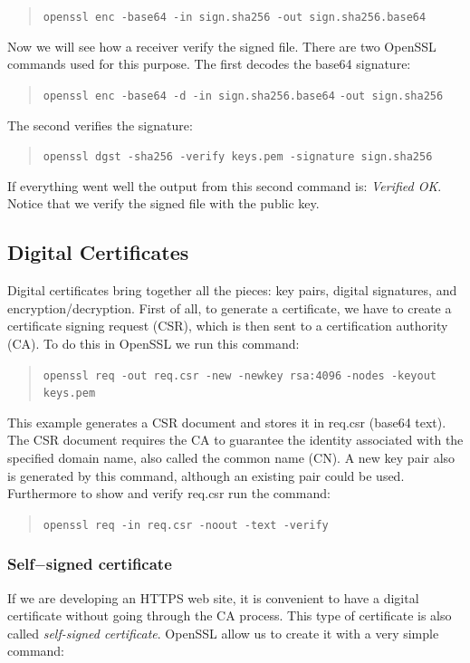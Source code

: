 \documentclass[11pt]{article}
\begin{document}
\begin{quote}
 \verb|openssl enc -base64 -in sign.sha256 -out sign.sha256.base64|
\end{quote}

Now we will see how a receiver verify the signed file. There are two OpenSSL commands used for this purpose. The first decodes the base64 signature:

\begin{quote}
 \verb|openssl enc -base64 -d -in sign.sha256.base64|\newline
 \verb|-out sign.sha256|
\end{quote}

The second verifies the signature:

\begin{quote}
 \verb|openssl dgst -sha256 -verify keys.pem -signature sign.sha256|
\end{quote}

If everything went well the output from this second command is: {\em Verified OK}. Notice that we verify the signed file with the public key.

\subsection{Digital Certificates}
Digital certificates bring together all the pieces: key pairs, digital signatures, and encryption/decryption. First of all, to generate a certificate, we have to create a certificate signing request (CSR), which is then sent to a certification authority (CA). To do this in OpenSSL we run this command:

\begin{quote}
 \verb|openssl req -out req.csr -new -newkey rsa:4096|\newline
 \verb|-nodes -keyout keys.pem|
\end{quote}

This example generates a CSR document and stores it in req.csr (base64 text). The CSR document requires the CA to guarantee the identity associated with the specified domain name, also called the common name (CN). A new key pair also is generated by this command, although an existing pair could be used. Furthermore to show and verify req.csr run the command:

\begin{quote}
 \verb|openssl req -in req.csr -noout -text -verify|
\end{quote}

\subsubsection{Self$-$signed certificate}
If we are developing an HTTPS web site, it is convenient to have a digital certificate without going through the CA process. This type of certificate is also called {\em self-signed certificate}. OpenSSL allow us to create it with a very simple command:
\end{document}

